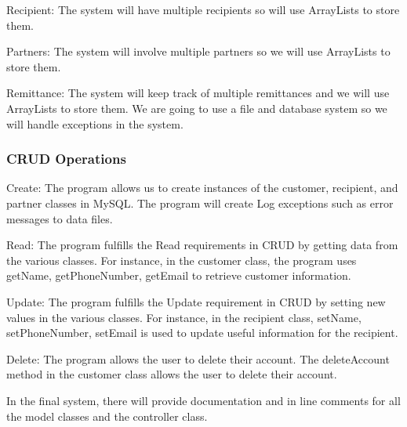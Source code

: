 \documentclass[onecolumn, letterpaper, ]{report}
\begin{document}
Recipient: The system will have multiple recipients so will use ArrayLists to store them.

Partners: The system will involve multiple partners so we will use ArrayLists to store them.

Remittance: The system will keep track of multiple remittances and we will use ArrayLists to store them. 
We are going to use a file and database system so we will handle exceptions in the system.
\\ 

\subsubsection{CRUD Operations}
Create: The program allows us to create instances of the customer, recipient, and partner classes in MySQL. The program will create Log exceptions such as error messages to data files.

Read: The program fulfills the Read requirements in CRUD by getting data from the various classes. For instance, in the customer class, the program uses getName, getPhoneNumber, getEmail to retrieve customer information.

Update: The program fulfills the Update requirement in CRUD by setting new values in the various classes. For instance, in the recipient class, setName, setPhoneNumber, setEmail is used to update useful information for the recipient.

Delete: The program allows the user to delete their account. The deleteAccount method in the customer class allows the user to delete their account.

In the final system, there will provide documentation and in line comments for all the model classes and the controller class.


    
    
\end{document}

